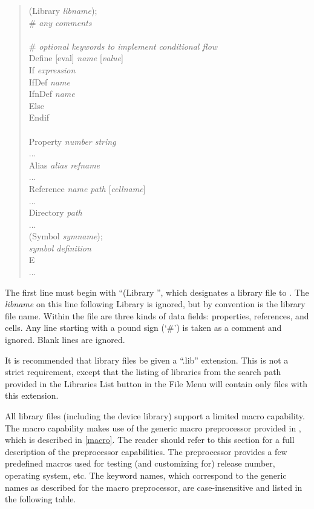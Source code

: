 \begin{quote}\vt
(Library {\it libname\/});\\
{\vt \#} {\it any comments}\\
\\
{\vt \#} {\it optional keywords to implement conditional flow}\\
{\vt Define} [{\vt eval}] {\it name} [{\it value\/}]\\
{\vt If} {\it expression}\\
{\vt IfDef} {\it name}\\
{\vt IfnDef} {\it name}\\
{\vt Else}\\
{\vt Endif}\\
\\
Property {\it number string}\\
...\\
Alias {\it alias refname}\\
...\\
Reference {\it name path} [{\it cellname\/}]\\
...\\
Directory {\it path}\\
...\\
(Symbol {\it symname\/});\\
{\it symbol definition}\\
E\\
...\\
\end{quote}

The first line must begin with ``{\vt (Library }'', which designates a
library file to {\Xic}.  The {\it libname} on this line following {\vt
Library} is ignored, but by convention is the library file name. 
Within the file are three kinds of data fields:  properties,
references, and cells.  Any line starting with a pound sign (`\#') is
taken as a comment and ignored.  Blank lines are ignored.

It is recommended that library files be given a ``{\vt .lib}''
extension.  This is not a strict requirement, except that the listing
of libraries from the search path provided in the {\cb Libraries List}
button in the {\cb File Menu} will contain only files with this
extension.

All library files (including the device library) support a limited
macro capability.  The macro capability makes use of the generic macro
preprocessor provided in {\Xic}, which is described in \ref{macro}. 
The reader should refer to this section for a full description of the
preprocessor capabilities.  The preprocessor provides a few predefined
macros used for testing (and customizing for) release number,
operating system, etc.  The keyword names, which correspond to the
generic names as described for the macro preprocessor, are
case-insensitive and listed in the following table.

